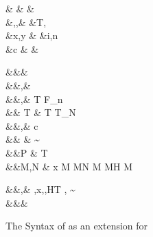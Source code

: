 \documentclass[manuscript,screen,nonacm]{acmart}
\begin{document}
\begin{figure}[ht]
 \centering
 \begin{syntax}
  &\shl{\chi} &  & \\
  &\TyVar,\beta,\Co &\qquad{} &T, \\
  &x,y &\qquad{} &i,n \in {} \\
  &c & &
 \end{syntax}
 \begin{syntax}
  &&\square & \\
  &&\kappa,\eta \bnfeq& \shl{\chi} \bnfor \STAR \bnfor {} \bnfor \kappa \to \kappa \bnfor {}\\
  &&\tau,\sigma \bnfeq& \TyVar \bnfor T \bnfor \tau \to \tau \bnfor \tau\App\tau \bnfor \Forall {\TyVar\co\kappa} \tau \bnfor F_n \bnfor \shl{\Forall \chi \tau} \bnfor \shl{\tau\App\kappa} \bnfor {}\\
  && T \bnfeq& T \bnfor T_N\\
  &&\nu,\Co \bnfeq& c \bnfor {}\tau \bnfor \Sym\Co \bnfor \trans\nu\Co %
 \bnfor \Forall {\TyVar\co\kappa} \Co \bnfor \Co\At\tau %
 \bnfor \nu\App\Co \bnfor \Left \Co \bnfor \Right \Co  %
 \bnfor \shl{\Forall \chi \Co} \bnfor \shl{\Co\App\chi} %
 \bnfor \shl{\Co\At\chi}\\
  && \phi \bnfeq& \sigma \sim \tau\\
  &&P \bnfeq& T\App\shl{\many\chi}\App\many{\TyVar\co\kappa} \\
  &&M,N \bnfeq& x \bnfor {} M \bnfor M\App N \bnfor \TLam{\tau\co\kappa} M \bnfor M\App \tau \bnfor H \bnfor \Case M  \bnfor \Cast \Tm \Co %
 \bnfor \shl{\TLam \chi \Tm} \bnfor \shl{\Tm\App\kappa} \\

 \end{syntax}
 \begin{syntax}
  &&\TEnv,\Delta \bnfeq& \empt \bnfor \TEnv,x\co\tau \bnfor \TEnv,\TyVar\co\kappa \bnfor \TEnv,H\co T \bnfor \TEnv, \Co \co \tau\sim\sigma\\
  &&\Subst \bnfeq& \empt \bnfor \Set{\many{\TyVar \mapsto \tau}}
 \end{syntax}
 \caption{The Syntax of \SFP as an extension for \SFC}
 \label{fig:sfp-syntax}
\end{figure}
\end{document}
